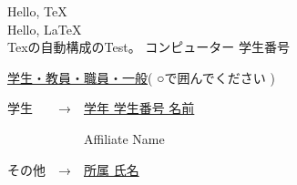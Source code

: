 \documentclass{article}
\begin{document}
Hello, \TeX \\

Hello, \LaTeX \\

Texの自動構成のTest。
コンピューター
学生番号

\begin{description}
\item{} \underline{学生・教員・職員・一般}{\footnotesize ( ○で囲んでください ) }
\item{} 学生　　→　\underline{学年\hspace{2cm} 学生番号\hspace{3cm} 名前\hspace{5cm}}
\item{} 　　　　　　Affiliate\hspace{62mm} Name\hspace{5cm} \vspace*{-3mm}
\item{} その他　→　\underline{所属\hspace{67.5mm} 氏名\hspace{5cm}}
\end{description}
\end{document}
